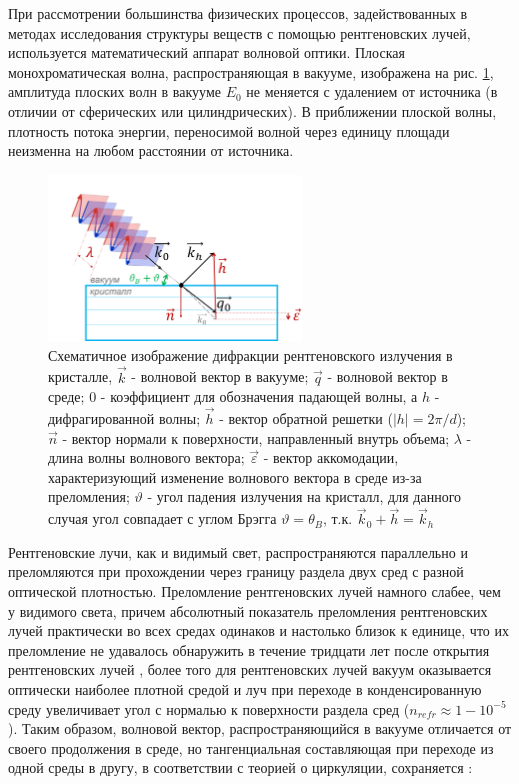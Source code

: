  При рассмотрении большинства физических процессов, задействованных
  в методах исследования структуры веществ с помощью рентгеновских лучей,
  используется математический аппарат волновой оптики.
  Плоская монохроматическая волна, распространяющая в вакууме, изображена на рис. \ref{ris:plane_wave_vacuum},
  амплитуда плоских волн в вакууме $E_0$ не меняется с удалением от
  источника (в отличии от сферических или цилиндрических). В приближении плоской волны,
  плотность потока энергии, переносимой волной через единицу площади неизменна на любом расстоянии от источника.

  \begin{figure}[H]
    \centering
    \includegraphics[width=0.6\textwidth]{images/plane_wave_vacuum.png}
    \caption{Схематичное изображение дифракции рентгеновского излучения в кристалле,
      $\vec {k}$ - волновой вектор в вакууме; $\vec {q}$ - волновой вектор в среде;
     $0$ - коэффициент для обозначения падающей волны, а $h$ -  дифрагированной волны; $\vec{h}$ - вектор
     обратной решетки ($|h|=2\pi/d$); $\vec{n}$ - вектор нормали к поверхности, направленный внутрь объема;
     $\lambda$ - длина волны волнового вектора; $\vec{\varepsilon}$ - вектор аккомодации, характеризующий изменение
     волнового вектора в среде из-за преломления; $\vartheta$ - угол падения излучения на кристалл, для данного
     случая угол совпадает с углом Брэгга $\vartheta = \theta_B$, т.к.  $\vec {k}_0 + \vec{h} = \vec {k}_h $}
    \label{ris:plane_wave_vacuum}
  \end{figure}

Рентгеновские лучи, как и видимый свет, распространяются параллельно и преломляются при
прохождении через границу раздела двух сред с разной оптической плотностью.
 Преломление рентгеновских лучей намного слабее, чем у видимого света, причем
 абсолютный показатель преломления рентгеновских лучей практически во всех средах
одинаков и настолько близок к единице, что их преломление не удавалось обнаружить
 в течение тридцати лет после открытия рентгеновских лучей \cite{fetisov2007}, более того
 для рентгеновских лучей вакуум оказывается оптически наиболее плотной средой и луч
 при переходе в конденсированную среду увеличивает угол с нормалью к поверхности раздела сред ($n_{refr} \approx 1-10^{-5}$).
 Таким образом, волновой вектор, распространяющийся в вакууме отличается от своего продолжения в
 среде, но тангенциальная составляющая при переходе из одной среды в другу, в соответствии с теорией о
 циркуляции, сохраняется \cite{landau_8_1992}:

